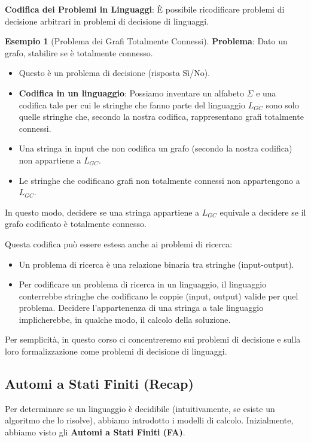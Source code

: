 \documentclass[a4paper]{article}
\theoremstyle{definition} %
\newtheorem{example}{Esempio}
\begin{document}
\textbf{Codifica dei Problemi in Linguaggi}:
È possibile ricodificare problemi di decisione arbitrari in problemi di decisione di linguaggi.
\begin{example}[Problema dei Grafi Totalmente Connessi]
    \textbf{Problema}: Dato un grafo, stabilire se è totalmente connesso.
    \begin{itemize}
        \item Questo è un problema di decisione (risposta Sì/No).
        \item \textbf{Codifica in un linguaggio}: Possiamo inventare un alfabeto $\Sigma$ e una codifica tale per cui le stringhe che fanno parte del linguaggio $L_{GC}$ sono solo quelle stringhe che, secondo la nostra codifica, rappresentano grafi totalmente connessi.
        \item Una stringa in input che non codifica un grafo (secondo la nostra codifica) non appartiene a $L_{GC}$.
        \item Le stringhe che codificano grafi non totalmente connessi non appartengono a $L_{GC}$.
    \end{itemize}
    In questo modo, decidere se una stringa appartiene a $L_{GC}$ equivale a decidere se il grafo codificato è totalmente connesso.
\end{example}

Questa codifica può essere estesa anche ai problemi di ricerca:
\begin{itemize}
    \item Un problema di ricerca è una relazione binaria tra stringhe (input-output).
    \item Per codificare un problema di ricerca in un linguaggio, il linguaggio conterrebbe stringhe che codificano le coppie (input, output) valide per quel problema. Decidere l'appartenenza di una stringa a tale linguaggio implicherebbe, in qualche modo, il calcolo della soluzione.
\end{itemize}
Per semplicità, in questo corso ci concentreremo sui problemi di decisione e sulla loro formalizzazione come problemi di decisione di linguaggi.

\subsection{Automi a Stati Finiti (Recap)}
Per determinare se un linguaggio è decidibile (intuitivamente, se esiste un algoritmo che lo risolve), abbiamo introdotto i modelli di calcolo. Inizialmente, abbiamo visto gli \textbf{Automi a Stati Finiti (FA)}.
\end{document}
